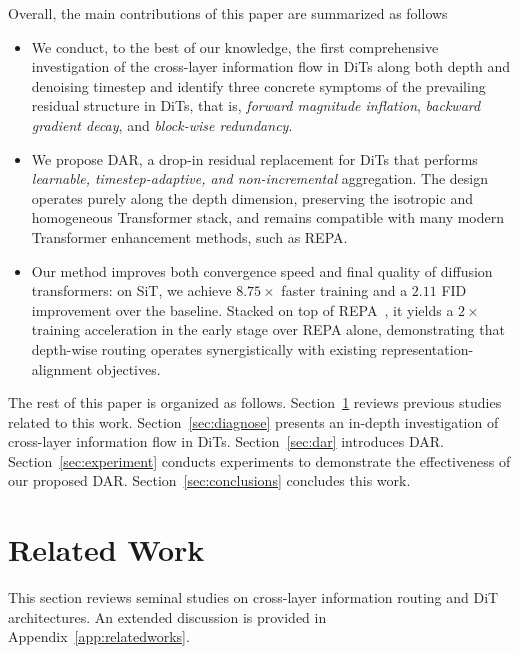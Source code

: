 \documentclass[]{ant_tech_report}
\begin{document}
Overall, the main contributions of this paper are summarized as follows
\begin{itemize}
    \item We conduct, to the best of our knowledge, the first comprehensive investigation of the cross-layer information flow in DiTs along both depth and denoising timestep and identify three concrete symptoms of the prevailing residual structure in DiTs, that is, \emph{forward magnitude inflation}, \emph{backward gradient decay}, and \emph{block-wise redundancy}.
    \item We propose \textsc{DAR}, a drop-in residual replacement for DiTs that performs \emph{learnable, timestep-adaptive, and non-incremental} aggregation. The design operates purely along the depth dimension, preserving the isotropic and homogeneous Transformer stack, and remains compatible with many modern Transformer enhancement methods, such as REPA.
    \item Our method improves both convergence speed and final quality of diffusion transformers: on SiT, we achieve $8.75 \times$ faster training and a $2.11$ FID improvement over the baseline. Stacked on top of REPA~\citep{yu2025repa}, it yields a $2\times$ training acceleration in the early stage over REPA alone, demonstrating that depth-wise routing operates synergistically with existing representation-alignment objectives.
\end{itemize}
The rest of this paper is organized as follows. Section~\ref{sec:rw} reviews previous studies related to this work. Section~\ref{sec:diagnose} presents an in-depth investigation of cross-layer information flow in DiTs. Section~\ref{sec:dar} introduces DAR. Section~\ref{sec:experiment} conducts experiments to demonstrate the effectiveness of our proposed DAR. Section~\ref{sec:conclusions} concludes this work.



\section{Related Work}  \label{sec:rw}

This section reviews seminal studies on cross-layer information routing and DiT architectures. An extended discussion is provided in Appendix~\ref{app:relatedworks}.
\vspace{-1em}
\end{document}
